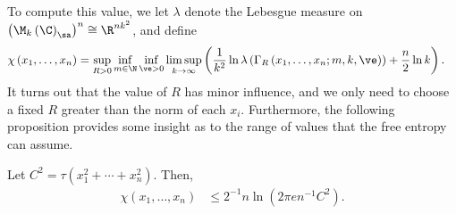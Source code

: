 \documentclass[10pt]{mypackage}
\begin{document}
To compute this value, we let $\lambda$ denote the Lebesgue measure on $\left( \M_k\left( \C \right)_{\sa} \right)^n\cong \R^{nk^2}$, and define
\begin{align*}
  \chi\left( x_1,\dots,x_n \right) &= \sup_{R > 0}\inf_{m\in \N}\inf_{\ve > 0} \limsup_{k\rightarrow\infty} \left( \frac{1}{k^2} \ln \lambda \left( \Gamma_{R}\left( x_1,\dots,x_n; m,k,\ve \right) \right) + \frac{n}{2}\ln k \right).
\end{align*}
It turns out that the value of $R$ has minor influence, and we only need to choose a fixed $R$ greater than the norm of each $x_i$. Furthermore, the following proposition provides some insight as to the range of values that the free entropy can assume.
\begin{proposition}
  Let $C^2 = \tau\left( x_1^2 + \cdots + x_n^2 \right)$. Then,
  \begin{align*}
    \chi\left( x_1,\dots,x_n \right) &\leq 2^{-1}n\ln\left( 2\pi en^{-1}C^2 \right).
  \end{align*}
\end{proposition}
\end{document}
